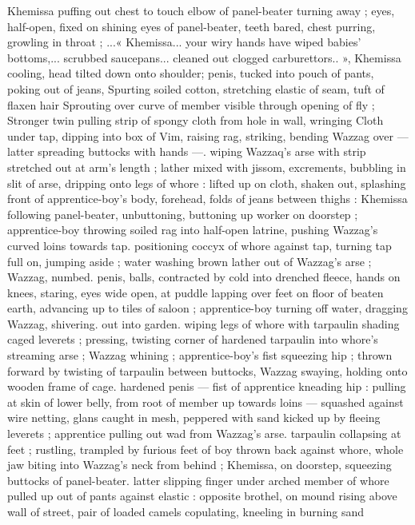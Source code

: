 Khemissa puffing out chest to touch elbow of panel-beater turning
away ; eyes, half-open, fixed on shining eyes of panel-beater, teeth
bared, chest purring, growling in throat ; ...« Khemissa... your wiry
hands have wiped babies’ bottoms,... scrubbed saucepans... cleaned
out clogged carburettors.. », Khemissa cooling, head tilted down onto
shoulder; penis, tucked into pouch of pants, poking out of jeans,
Spurting soiled cotton, stretching elastic of seam, tuft of flaxen hair
Sprouting over curve of member visible through opening of fly ;
Stronger twin pulling strip of spongy cloth from hole in wall, wringing
Cloth under tap, dipping into box of Vim, raising rag, striking,
bending Wazzag over --- latter spreading buttocks with hands ---.
wiping Wazzaq's arse with strip stretched out at arm's length ; lather
mixed with jissom, excrements, bubbling in slit of arse, dripping onto
legs of whore : lifted up on cloth, shaken out, splashing front of
apprentice-boy's body, forehead, folds of jeans between thighs :
Khemissa following panel-beater, unbuttoning, buttoning up worker
on doorstep ; apprentice-boy throwing soiled rag into half-open
latrine, pushing Wazzag's curved loins towards tap. positioning
coccyx of whore against tap, turning tap full on, jumping aside ;
water washing brown lather out of Wazzag's arse ; Wazzag, numbed.
penis, balls, contracted by cold into drenched fleece, hands on
knees, staring, eyes wide open, at puddle lapping over feet on floor
of beaten earth, advancing up to tiles of saloon ; apprentice-boy
turning off water, dragging Wazzag, shivering. out into garden.
wiping legs of whore with tarpaulin shading caged leverets ;
pressing, twisting corner of hardened tarpaulin into whore's
streaming arse ; Wazzag whining ; apprentice-boy’s fist squeezing
hip ; thrown forward by twisting of tarpaulin between buttocks,
Wazzag swaying, holding onto wooden frame of cage. hardened
penis --- fist of apprentice kneading hip : pulling at skin of lower
belly, from root of member up towards loins --- squashed against
wire netting, glans caught in mesh, peppered with sand kicked up by
fleeing leverets ; apprentice pulling out wad from Wazzag's arse.
tarpaulin collapsing at feet ; rustling, trampled by furious feet of boy
thrown back against whore, whole jaw biting into Wazzag's neck from
behind ; Khemissa, on doorstep, squeezing buttocks of panel-beater.
latter slipping finger under arched member of whore pulled up out of
pants against elastic : opposite brothel, on mound rising above wall
of street, pair of loaded camels copulating, kneeling in burning sand
